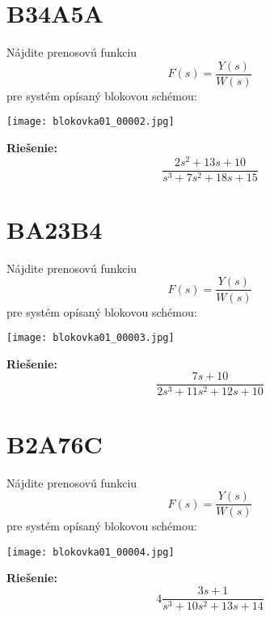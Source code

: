 \documentclass[a4paper, 12pt]{article}
\newenvironment{task}{}{}
\newenvironment{solution}{\noindent\textbf{Riešenie:}}{}
\begin{document}
\section*{B34A5A}
\begin{task}
    Nájdite prenosovú funkciu 
    \begin{equation*}
        F(s)=\dfrac{Y(s)}{W(s)}
    \end{equation*}
    pre systém opísaný blokovou schémou: 

    \texttt{[image: blokovka01\_00002.jpg]} 
\end{task} 

\begin{solution}
    \begin{equation*}
        \dfrac{2s^2+13s+10}{s^3+7s^2+18s+15}
    \end{equation*}
\end{solution}

\section*{BA23B4}
\begin{task}
    Nájdite prenosovú funkciu 
    \begin{equation*}
        F(s)=\dfrac{Y(s)}{W(s)}
    \end{equation*}pre systém opísaný blokovou schémou: 

    \texttt{[image: blokovka01\_00003.jpg]} 
\end{task} 

\begin{solution}
    \begin{equation*}
        \dfrac{7s+10}{2s^3+11s^2+12s+10}
    \end{equation*}
\end{solution}

\section*{B2A76C}
\begin{task}
    Nájdite prenosovú funkciu 
    \begin{equation*}
        F(s)=\dfrac{Y(s)}{W(s)}
    \end{equation*}
    pre systém opísaný blokovou schémou: 

    \texttt{[image: blokovka01\_00004.jpg]} 
\end{task} 

\begin{solution}
    \begin{equation*}
        4\dfrac{3s+1}{s^3+10s^2+13s+14}
    \end{equation*}
\end{solution}
\end{document}
